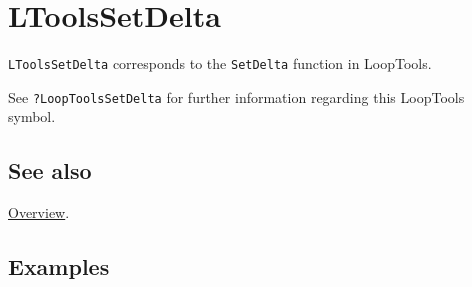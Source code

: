 \documentclass[../FeynHelpersManual.tex]{subfiles}
\begin{document}
\hypertarget{ltoolssetdelta}{
\section{LToolsSetDelta}\label{ltoolssetdelta}}

\texttt{LToolsSetDelta} corresponds to the \texttt{SetDelta} function in
LoopTools.

See \texttt{?LoopTools\textasciigrave SetDelta} for further information
regarding this LoopTools symbol.

\subsection{See also}

\hyperlink{toc}{Overview}.

\subsection{Examples}
\end{document}
